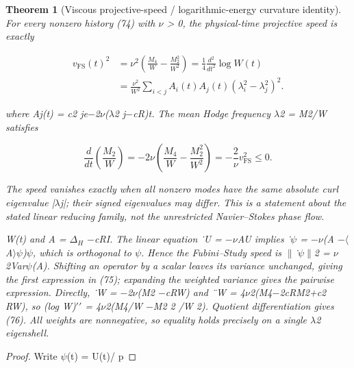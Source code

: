 \documentclass[10pt,letterpaper]{article}
\newtheorem{theorem}{Theorem}[section]
\theoremstyle{remark}
\begin{document}
\begin{theorem}[Viscous projective-speed / logarithmic-energy curvature identity]

For every nonzero history (74) with \(\nu \) > 0, the physical-time projective speed is exactly


\begin{equation}
\tag{75}\label{eq:75}
\begin{aligned}v_{\mathrm{FS}}(t)^2&=\nu^2\left(\frac{M_4}{W}-\frac{M_2^2}{W^2}\right)=\frac14\frac{d^2}{dt^2}\log W(t)\\&=\frac{\nu^2}{W^2}\sum_{i<j}A_i(t)A_j(t)(\lambda_i^2-\lambda_j^2)^2.\end{aligned}
\end{equation}

where Aj(t) = c2 je\(- \)2\(\nu \)(\(\lambda \)2 j\(- \)cR)t. The mean Hodge frequency \(\lambda \)2 = M2/W satisfies



\begin{equation}
\tag{76}\label{eq:76}
\frac{d}{dt}\left(\frac{M_2}W\right)=-2\nu\left(\frac{M_4}W-\frac{M_2^2}{W^2}\right)=-\frac2\nu v_{\mathrm{FS}}^2\le0.
\end{equation}

The speed vanishes exactly when all nonzero modes have the same absolute curl eigenvalue |\(\lambda \)j|; their signed eigenvalues may differ. This is a statement about the stated linear reducing family, not the unrestricted Navier–Stokes phase flow.


W(t) and A = \(\Delta_H\) \(- \)cRI. The linear equation ˙U = \(- \nu \)AU implies ˙\(\psi \) = \(- \nu \)(A \(- \langle \)A\(\rangle \psi \))\(\psi \), which is orthogonal to \(\psi \). Hence the Fubini–Study speed is \(\| \)˙\(\psi \| \)2 = \(\nu \)2Var\(\psi \)(A). Shifting an operator by a scalar leaves its variance unchanged, giving the first expression in (75); expanding the weighted variance gives the pairwise expression. Directly, ˙W = \(- \)2\(\nu \)(M2 \(- \)cRW) and ¨W = 4\(\nu \)2(M4\(- \)2cRM2+c2 RW), so (log W)\(\prime\)\(\prime\) = 4\(\nu \)2(M4/W \(- \)M2 2 /W 2). Quotient differentiation gives (76). All weights are nonnegative, so equality holds precisely on a single \(\lambda \)2 eigenshell.


\end{theorem}

\begin{proof}
Write \(\psi \)(t) = U(t)/ p

\end{proof}
\end{document}
